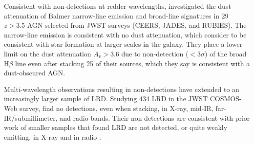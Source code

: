 \documentclass[utf8]{FrontiersinHarvard} %
\begin{document}
Consistent with non-detections at redder wavelengths, \citet{brooks2025here} investigated the dust attenuation of Balmer narrow-line emission and broad-line signatures in 29 $z > 3.5$ AGN selected from JWST surveys (CEERS, JADES, and RUBIES). The narrow-line emission is consistent with no dust attenuation, which \citet{brooks2025here} consider to be consistent with star formation at larger scales in the galaxy. They place a lower limit on the dust attenuation $A_v > 3.6$ due to non-detection ($<3\sigma$) of the broad H$\beta$ line even after stacking 25 of their sources, which they say is consistent with a dust-obscured AGN. 




Multi-wavelength observations resulting in non-detections have extended to an increasingly larger sample of LRD. Studying 434 LRD in the JWST COSMOS-Web survey, \citet{akins2025cosmos} find 
no detections, even when stacking, in X-ray, mid-IR, far-IR/submillimeter, and radio bands. 
Their non-detections are consistent with prior work of smaller samples that found LRD are not detected, or quite weakly emitting, in X-ray \citep{ananna2024x,yue2024stacking,maiolino2025jwst} and in radio \citep{mazzolari2024radio,perger2025deep,gloudemans2025another}.
\end{document}
